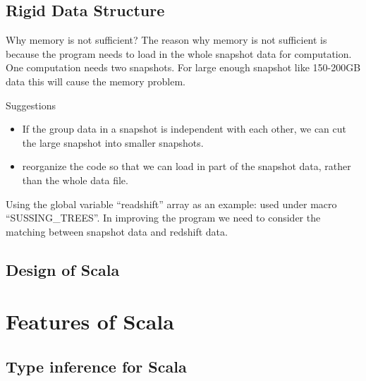 \documentclass[notheorems, aspectratio=54]{beamer}
\begin{document}
\subsection{Rigid Data Structure}
\begin{frame}

\begin{block}{Why memory is not sufficient?} 
The reason why memory is not sufficient is because the program needs to load in the whole snapshot data for computation. One computation needs two snapshots. For large enough snapshot like 150-200GB data this will cause the memory problem.
 \end{block}
 
\begin{block}{Suggestions}
\begin{itemize}
 \item If the group data in a snapshot is independent with each other, we can cut the large snapshot into smaller snapshots. 
 \item reorganize the code so that we can load in part of the snapshot data, rather than the 
 whole data file.
\end{itemize}
\end{block}

\end{frame}

\begin{frame}
  
  \begin{block}{Using the global variable} 
  ``readshift'' array as an example:  used under macro ``SUSSING\_TREES''. In improving the program we need to consider
  the matching between snapshot data and redshift data.
 \end{block}
  
\end{frame}

\subsection{Design of Scala}
\begin{frame}
  
\end{frame}


\section{Features of Scala}
\subsection{Type inference for Scala}
\begin{frame}


\end{frame}


\end{document}
